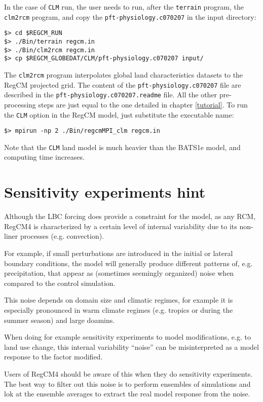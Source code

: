 In the case of \verb=CLM= run, the user needs to run, after the \verb=terrain=
program, the \verb=clm2rcm= program, and copy the \verb=pft-physiology.c070207=
in the input directory:

\begin{Verbatim}
$> cd $REGCM_RUN
$> ./Bin/terrain regcm.in
$> ./Bin/clm2rcm regcm.in
$> cp $REGCM_GLOBEDAT/CLM/pft-physiology.c070207 input/
\end{Verbatim}

The \verb=clm2rcm= program interpolates global land characteristics datasets
to the RegCM projected grid. The content of the \verb=pft-physiology.c070207=
file are described in the \verb=pft-physiology.c070207.readme= file.
All the other pre-processing steps are just equal to the one detailed in
chapter \ref{tutorial}. To run the \verb=CLM= option in the RegCM model, just
substitute the executable name:

\begin{Verbatim}
$> mpirun -np 2 ./Bin/regcmMPI_clm regcm.in
\end{Verbatim}

Note that the \verb=CLM= land model is much heavier than the BATS1e model, and
computing time increases.

\section{Sensitivity experiments hint}

Although the LBC forcing does provide a constraint for the model, as any RCM,
RegCM4 is characterized by a certain level of internal variability due to its
non-liner processes (e.g. convection).

For example, if small perturbations are introduced in the initial or lateral
boundary conditions, the model will generally produce different patterns of,
e.g. precipitation, that appear as (sometimes seemingly organized) noise when
compared to the control simulation.

This noise depends on domain size and climatic regimes, for example it is
especially pronounced in warm climate regimes (e.g. tropics or during the
summer season) and large doamins.

When doing for example sensitivity experiments to model modifications, e.g. to
land use change, this internal variability “noise” can be misinterpreted as a
model response to the factor modified.

Users of RegCM4 should be aware of this when they do sensitivity experiments.
The best way to filter out this noise is to perform ensembles of simulations
and lok at the ensemble averages to extract the real model response from the
noise.
